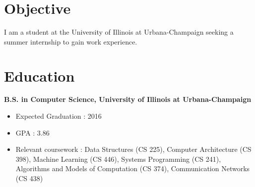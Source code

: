 \documentclass[margin]{res}
\begin{document}
 
 

\address{{\bf Present Address} \\ 512 S. 3rd St. \\ Urbana, Il 61820}
\address{{\bf Permanent Address} \\ 6147 Alcante Dr. \\ San Jose, CA 95129}

 
\begin{resume} 
 
\section{Objective} 
I am a student at the University of Illinois at Urbana-Champaign seeking a summer internship to gain work experience.

\section{Education} 
{\bf B.S. in Computer Science, University of Illinois at Urbana-Champaign}
\begin{itemize} \itemsep -3pt %
\item Expected Graduation : 2016
\item GPA : 3.86
\item Relevant coursework : Data Structures (CS 225), Computer Architecture (CS 398), Machine Learning (CS 446), 
Systems Programming (CS 241), Algorithms and Models of Computation (CS 374), Communication Networks (CS 438)
\end{itemize}
 


\end{resume}
\end{document}
